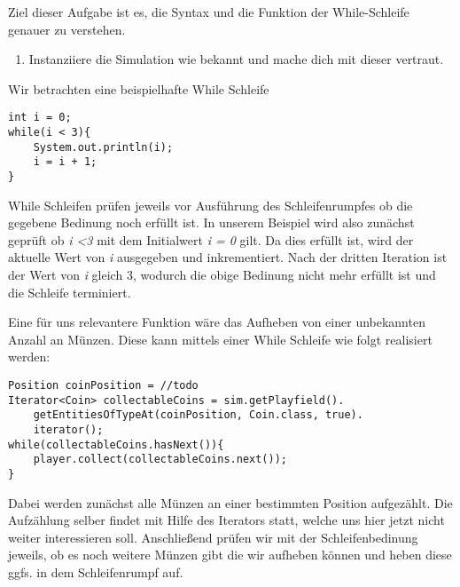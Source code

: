 
Ziel dieser Aufgabe ist es, die Syntax und die Funktion der While-Schleife genauer zu verstehen.
\begin{enumerate}[label=\alph*)]
    \item Instanziiere die Simulation wie bekannt und mache dich mit dieser vertraut.
\end{enumerate}

\begin{Infobox}
    Wir betrachten eine beispielhafte While Schleife
    \begin{lstlisting}[breaklines=true, numbers=none]
int i = 0;
while(i < 3){
    System.out.println(i);
    i = i + 1;
}
    \end{lstlisting}
    While Schleifen prüfen jeweils vor Ausführung des Schleifenrumpfes ob die gegebene Bedinung noch erfüllt ist. In unserem Beispiel 
    wird also zunächst geprüft ob \textit{i \textless 3} mit dem Initialwert \textit{i = 0} gilt. Da dies erfüllt ist, wird der aktuelle Wert von \textit{i}
    ausgegeben und inkrementiert. Nach der dritten Iteration ist der Wert von \textit{i} gleich 3, wodurch die obige Bedinung nicht mehr erfüllt ist
    und die Schleife terminiert.\par 
    Eine für uns relevantere Funktion wäre das Aufheben von einer unbekannten Anzahl an Münzen. Diese kann mittels einer While Schleife wie folgt 
    realisiert werden:
    \begin{lstlisting}[breaklines=true, numbers=none]
Position coinPosition = //todo
Iterator<Coin> collectableCoins = sim.getPlayfield().
    getEntitiesOfTypeAt(coinPosition, Coin.class, true).
    iterator();
while(collectableCoins.hasNext()){
    player.collect(collectableCoins.next());
}
    \end{lstlisting}
    Dabei werden zunächst alle Münzen an einer bestimmten Position aufgezählt. Die Aufzählung selber findet mit Hilfe 
    des Iterators statt, welche uns hier jetzt nicht weiter interessieren soll. Anschließend prüfen wir mit der Schleifenbedinung
    jeweils, ob es noch weitere Münzen gibt die wir aufheben können und heben diese ggfs. in dem Schleifenrumpf auf.
\end{Infobox}

